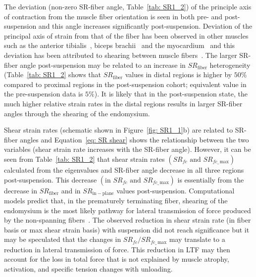 The deviation (non-zero SR-fiber angle, Table~\ref{tab: SR1_2}) of the principle axis of contraction from the muscle fiber orientation is seen in both pre- and post-suspension and this angle increases significantly post-suspension. 
Deviation of the principal axis of strain from that of the fiber has been observed in other muscles such as the anterior tibialis~\cite{RNS31}, biceps brachii~\cite{RNS35} and the myocardium~\cite{RNS36} and this deviation has been attributed to shearing between muscle fibers~\cite{RNS37, RNS38}. 
The larger SR-fiber angle post-suspension may be related to an increase in $SR_{\mathrm{fiber}}$ heterogeneity (Table~\ref{tab: SR1_2} shows that $SR_{\mathrm{fiber}}$ values in distal regions is higher by $50\%$ compared to proximal regions in the post-suspension cohort; equivalent value in the pre-suspension data is $5\%$).
It is likely that in the post-suspension state, the much higher relative strain rates in the distal regions results in larger SR-fiber angles through the shearing of the endomysium.

Shear strain rates (schematic shown in Figure~\ref{fig: SR1_1}b) are related to SR-fiber angles and Equation~\ref{eq: SR shear} shows the relationship between the two variables (shear strain rate increases with the SR-fiber angle).
However, it can be seen from Table~\ref{tab: SR1_2} that shear strain rates $(SR_{fc}\text{ and }SR_{fc\_\,\mathrm{max}})$ calculated from the eigenvalues and SR-fiber angle decrease in all three regions post-suspension. 
This decrease $(\text{in }SR_{fc} \text{ and }SR_{fc\_\,\mathrm{max}})$ is essentially from the decrease in $SR_{\mathrm{fiber}}$ and in $SR_{\mathrm{in-plane}}$ values post-suspension. 
Computational models predict that, in the prematurely terminating fiber, shearing of the endomysium is the most likely pathway for lateral transmission of force produced by the non-spanning fibers~\cite{RNS15}.
The observed reduction in shear strain rate (in fiber basis or max shear strain basis) with suspension did not reach significance but it may be speculated that the changes in $SR_{fc}/SR_{fc\_\,\mathrm{max}}$ may translate to a reduction in lateral transmission of force. 
This reduction in LTF may then account for the loss in total force that is not explained by muscle atrophy, activation, and specific tension changes with unloading. 

